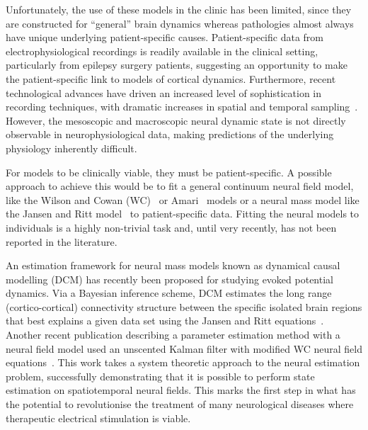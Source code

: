 \documentclass[10pt]{article}
\begin{document}
Unfortunately, the use of these models in the clinic has been limited, since they are constructed for ``general'' brain dynamics whereas pathologies almost always have unique underlying patient-specific causes. Patient-specific data from electrophysiological recordings is readily available in the clinical setting, particularly from epilepsy surgery patients, suggesting an opportunity to make the patient-specific link to models of cortical dynamics. Furthermore, recent technological advances have driven an increased level of sophistication in recording techniques, with dramatic increases in spatial and temporal sampling~\cite{Brinkmann2009}. However, the mesoscopic and macroscopic neural dynamic state is not directly observable in neurophysiological data, making predictions of the underlying physiology inherently difficult.

For models to be clinically viable, they must be patient-specific. A possible approach to achieve this would be to fit a general continuum neural field model, like the Wilson and Cowan (WC)~\cite{Wilson1973} or Amari~\cite{Amari1977} models or a neural mass model like the Jansen and Ritt model~\cite{Jansen1995} to patient-specific data. Fitting the neural models to individuals is a highly non-trivial task and, until very recently, has not been reported in the literature. 

An estimation framework for neural mass models known as dynamical causal modelling (DCM) \cite{David2003,David2006} has recently been proposed for studying evoked potential dynamics. Via a Bayesian inference scheme, DCM estimates the long range (cortico-cortical) connectivity structure between the specific isolated brain regions that best explains a given data set using the Jansen and Ritt equations~\cite{Jansen1995}. Another recent publication describing a parameter estimation method with a neural field model used an unscented Kalman filter with modified WC neural field equations~\cite{schiff2008kalman}. This work takes a system theoretic approach to the neural estimation problem, successfully demonstrating that it is possible to perform state estimation on spatiotemporal neural fields. This marks the first step in what has the potential to revolutionise the treatment of many neurological diseases where therapeutic electrical stimulation is viable.
\end{document}
